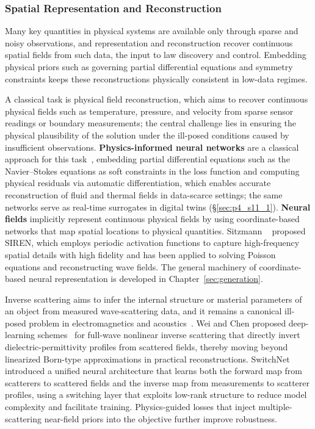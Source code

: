 \subsubsection{Spatial Representation and Reconstruction}

Many key quantities in physical systems are available only through sparse and noisy observations, and representation and reconstruction recover continuous spatial fields from such data, the input to law discovery and control.
Embedding physical priors such as governing partial differential equations and symmetry constraints keeps these reconstructions physically consistent in low-data regimes.

A classical task is physical field reconstruction, which aims to recover continuous physical fields such as temperature, pressure, and velocity from sparse sensor readings or boundary measurements; the central challenge lies in ensuring the physical plausibility of the solution under the ill-posed conditions caused by insufficient observations.
\textbf{Physics-informed neural networks} are a classical approach for this task~\cite{raissi2019physics}, embedding partial differential equations such as the Navier--Stokes equations as soft constraints in the loss function and computing physical residuals via automatic differentiation, which enables accurate reconstruction of fluid and thermal fields in data-scarce settings; the same networks serve as real-time surrogates in digital twins (§\ref{sec:p4_s11_1}).
\textbf{Neural fields} implicitly represent continuous physical fields by using coordinate-based networks that map spatial locations to physical quantities.
Sitzmann \etal~\cite{sitzmann2020implicit} proposed SIREN, which employs periodic activation functions to capture high-frequency spatial details with high fidelity and has been applied to solving Poisson equations and reconstructing wave fields.
The general machinery of coordinate-based neural representation is developed in Chapter~\ref{sec:generation}.

Inverse scattering aims to infer the internal structure or material parameters of an object from measured wave-scattering data, and it remains a canonical ill-posed problem in electromagnetics and acoustics~\cite{chen2020review}.
Wei and Chen proposed deep-learning schemes~\cite{wei2019deep} for full-wave nonlinear inverse scattering that directly invert dielectric-permittivity profiles from scattered fields, thereby moving beyond linearized Born-type approximations in practical reconstructions.
SwitchNet~\cite{khoo2019switchnet} introduced a unified neural architecture that learns both the forward map from scatterers to scattered fields and the inverse map from measurements to scatterer profiles, using a switching layer that exploits low-rank structure to reduce model complexity and facilitate training.
Physics-guided losses that inject multiple-scattering near-field priors into the objective further improve robustness.

